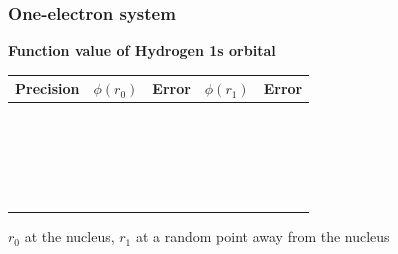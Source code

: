 \begin{frame}
\frametitle{One-electron system}
\centering
\scriptsize
\begin{table}
\textbf{Function value of Hydrogen 1s orbital}
\begin{tabular}{cclcl}
\hline
\hline
\multicolumn{1}{c}{\textbf{Precision}}&
\multicolumn{1}{c}{$\phi(r_0)$}&
\multicolumn{1}{l}{Error}&
\multicolumn{1}{c}{$\phi(r_1)$}&
\multicolumn{1}{l}{Error}\\
\hline                        
\hspace{10mm}\ &\hspace{20mm}\     &\hspace{15mm}\  &\hspace{20mm}\      &\hspace{10mm}\  \\
               &                   &                &                    &                \\
               &                   &                &                    &                \\
               &                   &                &                    &                \\
               &                   &                &                    &                \\
               &                   &                &                    &                \\
               &                   &                &                    &                \\
               &                   &                &                    &                \\
               &                   &                &                    &                \\
               &                   &                &                    &                \\
               &                   &                &                    &                \\
               &                   &                &                    &                \\
               &                   &                &                    &                \\
               &                   &                &                    &                \\
               &                   &                &                    &                \\
               &                   &                &                    &                \\
               &                   &                &                    &                \\
\hline
\hline
\end{tabular}
\end{table}
\tiny
$r_0$ at the nucleus, $r_1$ at a random point away from the nucleus
\end{frame}

